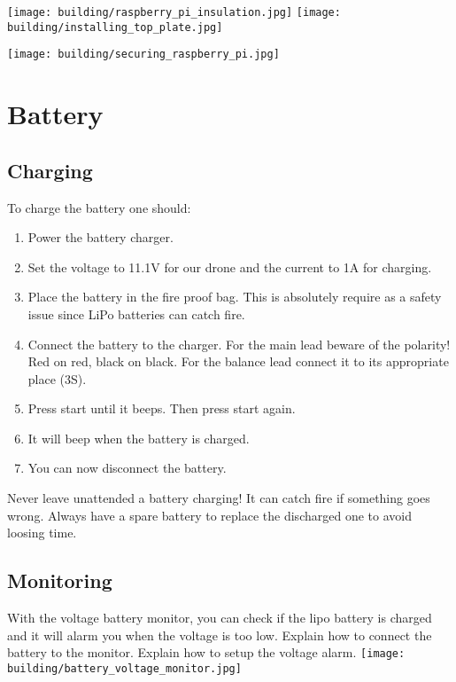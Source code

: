         \texttt{[image: building/raspberry\_pi\_insulation.jpg]}
        \texttt{[image: building/installing\_top\_plate.jpg]}
        
        \texttt{[image: building/securing\_raspberry\_pi.jpg]}
    
    \section{Battery}
        \subsection{Charging}
        To charge the battery one should:
            \begin{enumerate}
                \item Power the battery charger.
                \item Set the voltage to 11.1V for our drone and the current to 1A for charging.
                \item Place the battery in the fire proof bag. This is absolutely require as a safety issue since LiPo batteries can catch fire.
                \item Connect the battery to the charger. For the main lead beware of the polarity! Red on red, black on black. For the balance lead connect it to its appropriate place (3S).
                \item Press start until it beeps. Then press start again.
                \item It will beep when the battery is charged.
                \item You can now disconnect the battery.
            \end{enumerate}
            Never leave unattended a battery charging! It can catch fire if something goes wrong.
            Always have a spare battery to replace the discharged one to avoid loosing time.
            
        \subsection{Monitoring}
            With the voltage battery monitor, you can check if the lipo battery is charged and it will alarm you when the voltage is too low.
            {\color{orange} Explain how to connect the battery to the monitor.}
            {\color{orange} Explain how to setup the voltage alarm.}
            \texttt{[image: building/battery\_voltage\_monitor.jpg]}
            
